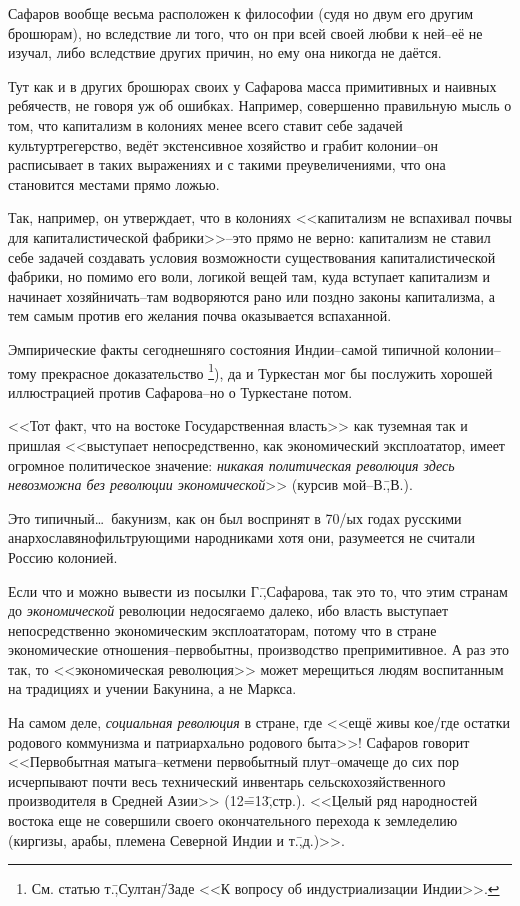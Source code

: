 Сафаров вообще весьма расположен к философии (судя но двум его другим брошюрам), но вследствие ли того, что он при всей своей любви к ней\---её не изучал, либо вследствие других причин, но ему она никогда не даётся.

Тут как и в других брошюрах своих у Сафарова масса примитивных и наивных ребячеств, не говоря уж об ошибках. Например, совершенно правильную мысль о том, что капитализм в колониях менее всего ставит себе задачей культуртрегерство, ведёт экстенсивное хозяйство и грабит колонии\---он расписывает в таких выражениях и с такими преувеличениями, что она становится местами прямо ложью.

Так, например, он утверждает, что в колониях <<капитализм не вспахивал почвы для капиталистической фабрики>>\---это прямо не верно: капитализм не ставил себе задачей создавать условия возможности существования капиталистической фабрики, но помимо его воли, логикой вещей там, куда вступает капитализм и начинает хозяйничать\---там водворяются рано или поздно законы капитализма, а тем самым против его желания почва оказывается вспаханной.

Эмпирические факты сегоднешняго состояния Индии\---самой типичной колонии\---тому прекрасное доказательство \footnote{См. статью т.\=,Султан\=/Заде <<К вопросу об индустриализации Индии>>.}), да и Туркестан мог бы послужить хорошей иллюстрацией против Сафарова\---но о Туркестане потом.

<<Тот факт, что на востоке Государственная власть>> как туземная так и пришлая <<выступает непосредственно, как экономический эксплоататор, имеет огромное политическое значение: \emph{никакая политическая революция здесь невозможна без революции экономической}>> (курсив мой\---В.\=,В.).

Это типичный\dots\ бакунизм, как он был воспринят в 70\-/ых годах русскими анархославянофильтрующими народниками хотя они, разумеется не считали
Россию колонией.

Если что и можно вывести из посылки Г.\=,Сафарова, так это то, что этим странам до \emph{экономической} революции недосягаемо далеко, ибо власть выступает непосредственно экономическим эксплоататорам, потому что в стране экономические отношения\---первобытны, производство препримитивное. А раз это так, то <<экономическая революция>> может мерещиться людям воспитанным на традициях и учении Бакунина, а не Маркса.

На самом деле, \emph{социальная революция} в стране, где <<ещё живы кое\-/где остатки родового коммунизма и патриархально родового быта>>! Сафаров говорит <<Первобытная матыга\---\glqq кетмен\grqq и первобытный плут\---\glqq омач\grqq еще до сих пор исчерпывают почти весь технический инвентарь сельскохозяйственного производителя в \glqq Средней Азии\grqq>> (12\==13\=,стр.). <<Целый ряд народностей востока еще не совершили своего окончательного перехода к земледелию (киргизы, арабы, племена Северной Индии и т.\=,д.)>>.

